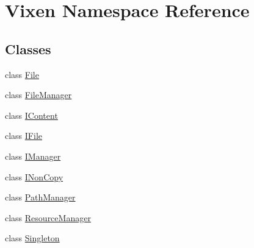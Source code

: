 \hypertarget{namespaceVixen}{}\section{Vixen Namespace Reference}
\label{namespaceVixen}
\subsection*{Classes}
\begin{DoxyCompactItemize}
\item 
class \hyperlink{classVixen_1_1File}{File}
\item 
class \hyperlink{classVixen_1_1FileManager}{File\+Manager}
\item 
class \hyperlink{classVixen_1_1IContent}{I\+Content}
\item 
class \hyperlink{classVixen_1_1IFile}{I\+File}
\item 
class \hyperlink{classVixen_1_1IManager}{I\+Manager}
\item 
class \hyperlink{classVixen_1_1INonCopy}{I\+Non\+Copy}
\item 
class \hyperlink{classVixen_1_1PathManager}{Path\+Manager}
\item 
class \hyperlink{classVixen_1_1ResourceManager}{Resource\+Manager}
\item 
class \hyperlink{classVixen_1_1Singleton}{Singleton}
\end{DoxyCompactItemize}
